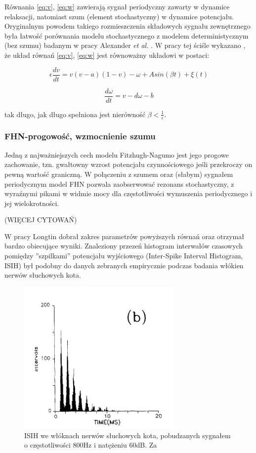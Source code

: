   Równania \ref{eq:v}, \ref{eq:w} zawierają sygnał periodyczny zawarty w dynamice relaksacji, natomiast szum (element stochastyczny) w dynamice potencjału. Oryginalnym powodem takiego rozmieszczenia składowych sygnału zewnętrznego była łatwość porównania modelu stochastycznego z modelem deterministycznym (bez szumu) badanym w pracy Alexander \emph{et al.} \cite{alexander}. W pracy tej ściśle wykazano \cite{longtin}, że układ równań \ref{eq:v}, \ref{eq:w} jest równoważny układowi w postaci:

  \begin{equation}
    \epsilon \frac{dv}{dt} = v(v-a)(1-v)- \omega + A sin(\beta t) + \xi(t)
  \end{equation}

  \begin{equation}
    \frac{d \omega}{dt} = v - d \omega - b
  \end{equation}

  tak długo, jak długo spełniona jest nierówność $\beta < \frac{1}{\epsilon}$.

  \subsubsection{FHN-progowość, wzmocnienie szumu}

  Jedną z najważniejszych cech modelu Fitzhugh-Nagumo jest jego progowe zachowanie, tzn. gwałtowny wzrost potencjału czynnościowego jeśli przekroczy on pewną wartość graniczną. W połączeniu z szumem oraz (słabym) sygnałem periodycznym model FHN pozwala zaobserwować rezonans stochastyczny, z wyraźnymi pikami w widmie mocy dla częstotliwości wymuszenia periodycznego i jej wielokrotności.

  (WIĘCEJ CYTOWAŃ)

  W pracy \cite{longtin} Longtin dobrał zakres parametrów powyższych równań oraz otrzymał bardzo obiecujące wyniki. Znaleziony przezeń histogram interwałów czasowych pomiędzy ''szpilkami'' potencjału wyjściowego (Inter-Spike Interval Histogram, ISIH) był podobny do danych zebranych empirycznie podczas badania włókien nerwów słuchowych kota.

  \begin{figure}
    \includegraphics[width=80mm]{images/longtin_fig1b.png}
    \caption{ISIH we włóknach nerwów słuchowych kota, pobudzanych sygnałem o częstotliwości 800Hz i natężeniu 60dB. Za \cite{longtin}}
  \end{figure}

